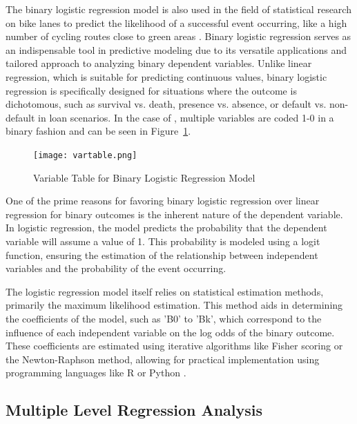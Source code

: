 \documentclass[12pt, letterpaper]{article}
\begin{document}
The binary logistic regression model is also used in the field of statistical research on bike lanes to predict the likelihood of a successful event occurring, like a high number of cycling routes close to green areas \cite{5CamposSnchez2019}. Binary logistic regression serves as an indispensable tool in predictive modeling due to its versatile applications and tailored approach to analyzing binary dependent variables. Unlike linear regression, which is suitable for predicting continuous values, binary logistic regression is specifically designed for situations where the outcome is dichotomous, such as survival vs. death, presence vs. absence, or default vs. non-default in loan scenarios. In the case of \citet{5CamposSnchez2019}, multiple variables are coded 1-0 in a binary fashion and can be seen in Figure~\ref{fig:vartable}. \par

\begin{figure}[tbp]
    \centering \texttt{[image: vartable.png]}
    \caption{Variable Table for Binary Logistic Regression Model}
    \label{fig:vartable}
\end{figure}

One of the prime reasons for favoring binary logistic regression over linear regression for binary outcomes is the inherent nature of the dependent variable. In logistic regression, the model predicts the probability that the dependent variable will assume a value of 1. This probability is modeled using a logit function, ensuring the estimation of the relationship between independent variables and the probability of the event occurring.

The logistic regression model itself relies on statistical estimation methods, primarily the maximum likelihood estimation. This method aids in determining the coefficients of the model, such as 'B0' to 'Bk', which correspond to the influence of each independent variable on the log odds of the binary outcome. These coefficients are estimated using iterative algorithms like Fisher scoring or the Newton-Raphson method, allowing for practical implementation using programming languages like R or Python \cite{Penman_2022}.

\subsection{Multiple Level  Regression Analysis}
\label{sec:mult}
\end{document}
